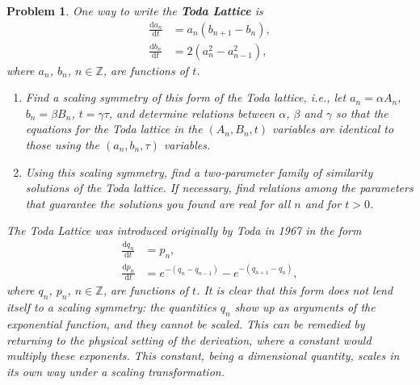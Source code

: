 \documentclass[12pt]{report}
\newtheorem{problem}{Problem}
\newcommand{\dd}[2]{\frac{\mathrm{d} #1}{\mathrm{d} #2}} %
\begin{document}
\begin{problem}
    One way to write the {\bf Toda Lattice} is
\begin{align*}
\dd{a_n}{t}&=a_n(b_{n+1}-b_n),\\
\dd{b_n}{t}&=2(a_n^2-a_{n-1}^2),
\end{align*}
where $a_n$, $b_n$, $n\in \mathbb{Z}$, are functions of $t$.

\begin{enumerate}

\item Find a scaling symmetry of this form of the Toda lattice, {\em i.e.}, let $a_n=\alpha A_n$, $b_n=\beta B_n$, $t=\gamma \tau$, and determine relations between $\alpha$, $\beta$ and $\gamma$ so that the equations for the Toda lattice in the $(A_n, B_n, t)$ variables are identical to those using the $(a_n, b_n, \tau)$ variables.

\item Using this scaling symmetry, find a two-parameter family of similarity solutions of the Toda lattice. If necessary, find relations among the parameters that guarantee the solutions you found are real for all $n$ and for $t>0$.

\end{enumerate}

The Toda Lattice was introduced originally by Toda in 1967 in the form
\begin{align*}
    \dd{q_n}{t}&=p_n,\\
    \dd{p_n}{t}&=e^{-(q_{n}-q_{n-1})}-e^{-(q_{n+1}-q_{n})},
\end{align*}
where $q_n$, $p_n$, $n\in \mathbb{Z}$, are functions of $t$. It is clear that this form does not lend itself to a scaling symmetry: the quantities $q_n$ show up as arguments of the exponential function, and they cannot be scaled. This can be remedied by returning to the physical setting of the derivation, where a constant would multiply these exponents. This constant, being a dimensional quantity, scales in its own way under a scaling transformation.

\end{problem}
\end{document}
